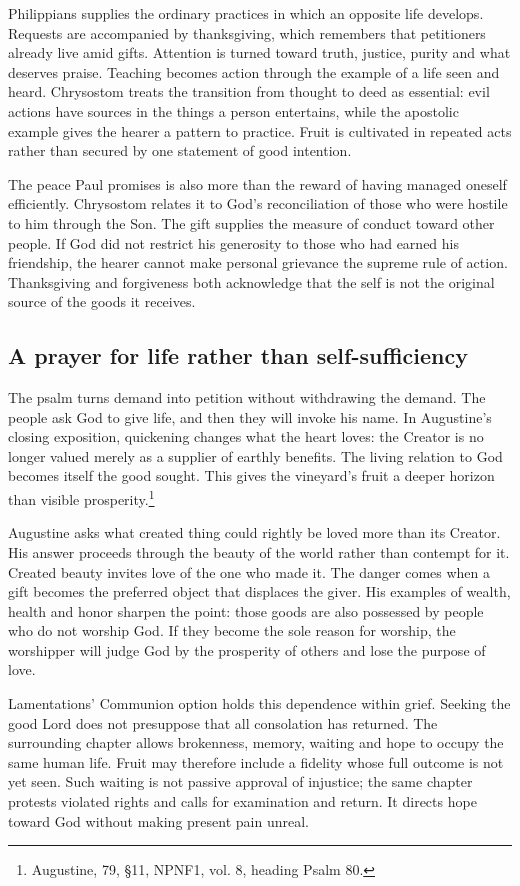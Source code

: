 Philippians supplies the ordinary practices in which an opposite life develops. Requests are accompanied by thanksgiving, which remembers that petitioners already live amid gifts. Attention is turned toward truth, justice, purity and what deserves praise. Teaching becomes action through the example of a life seen and heard. Chrysostom treats the transition from thought to deed as essential: evil actions have sources in the things a person entertains, while the apostolic example gives the hearer a pattern to practice. Fruit is cultivated in repeated acts rather than secured by one statement of good intention.

The peace Paul promises is also more than the reward of having managed oneself efficiently. Chrysostom relates it to God's reconciliation of those who were hostile to him through the Son. The gift supplies the measure of conduct toward other people. If God did not restrict his generosity to those who had earned his friendship, the hearer cannot make personal grievance the supreme rule of action. Thanksgiving and forgiveness both acknowledge that the self is not the original source of the goods it receives.

\subsection{A prayer for life rather than self-sufficiency}
The psalm turns demand into petition without withdrawing the demand. The people ask God to give life, and then they will invoke his name. In Augustine's closing exposition, quickening changes what the heart loves: the Creator is no longer valued merely as a supplier of earthly benefits. The living relation to God becomes itself the good sought. This gives the vineyard's fruit a deeper horizon than visible prosperity.\footnote{Augustine,  79, §11, NPNF1, vol. 8, heading Psalm 80.}

Augustine asks what created thing could rightly be loved more than its Creator. His answer proceeds through the beauty of the world rather than contempt for it. Created beauty invites love of the one who made it. The danger comes when a gift becomes the preferred object that displaces the giver. His examples of wealth, health and honor sharpen the point: those goods are also possessed by people who do not worship God. If they become the sole reason for worship, the worshipper will judge God by the prosperity of others and lose the purpose of love.

Lamentations' Communion option holds this dependence within grief. Seeking the good Lord does not presuppose that all consolation has returned. The surrounding chapter allows brokenness, memory, waiting and hope to occupy the same human life. Fruit may therefore include a fidelity whose full outcome is not yet seen. Such waiting is not passive approval of injustice; the same chapter protests violated rights and calls for examination and return. It directs hope toward God without making present pain unreal.

